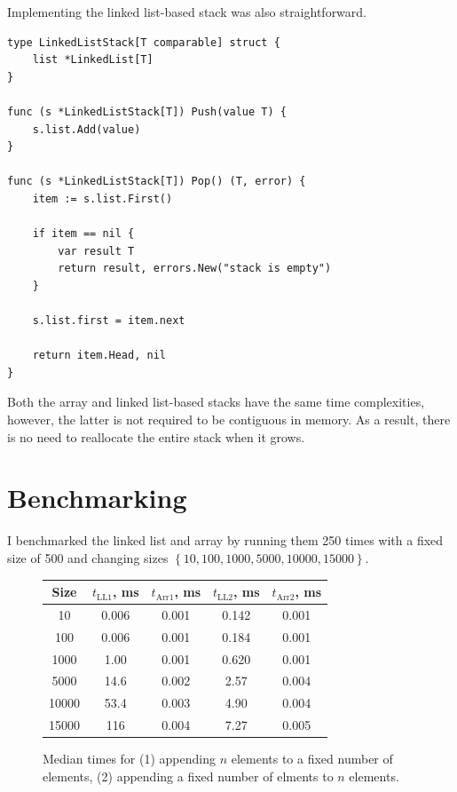 \documentclass[a4paper,11pt]{article}
\begin{document}
    Implementing the linked list-based stack was also straightforward.

    \begin{verbatim}
type LinkedListStack[T comparable] struct {
    list *LinkedList[T]
}

func (s *LinkedListStack[T]) Push(value T) {
    s.list.Add(value)
}

func (s *LinkedListStack[T]) Pop() (T, error) {
    item := s.list.First()

    if item == nil {
        var result T
        return result, errors.New("stack is empty")
    }

    s.list.first = item.next

    return item.Head, nil
}
    \end{verbatim}

    Both the array and linked list-based stacks have the same time complexities, however, the latter is not required to be contiguous in memory. As a result, there is no need to reallocate the entire stack when it grows.

    \section*{Benchmarking}

    I benchmarked the linked list and array by running them 250 times with a fixed size of 500 and changing sizes $\left\{10, 100, 1000, 5000, 10000, 15000\right\}$.

    \begin{figure}[H]
        \centering
        
        \begin{tabular}{c|c|c|c|c}
            Size & $t_\text{LL1}$, ms & $t_\text{Arr1}$, ms & $t_\text{LL2}$, ms & $t_\text{Arr2}$, ms \\
            \hline
            \hline
            10 & 0.006 & 0.001 & 0.142 & 0.001 \\
            \hline
            100 & 0.006 & 0.001 & 0.184 & 0.001 \\
            \hline
            1000 & 1.00 & 0.001 & 0.620 & 0.001 \\
            \hline
            5000 & 14.6 & 0.002 & 2.57 & 0.004 \\
            \hline
            10000 & 53.4 & 0.003 & 4.90 & 0.004 \\
            \hline
            15000 & 116 & 0.004 & 7.27 & 0.005 \\
        \end{tabular}

        \caption{Median times for (1) appending $n$ elements to a fixed number of elements, (2) appending a fixed number of elments to $n$ elements.}
    \end{figure}
\end{document}
